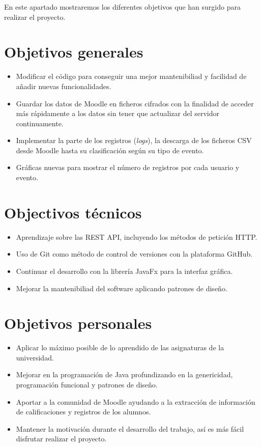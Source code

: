 
En este apartado mostraremos los diferentes objetivos que han surgido para realizar el proyecto.

\section{Objetivos generales}

\begin{itemize}
	\item Modificar el código para conseguir una mejor mantenibiliad y facilidad de añadir nuevas funcionalidades. 
	\item Guardar los datos de Moodle en ficheros cifrados con la finalidad de acceder más rápidamente a los datos sin tener que actualizar del servidor continuamente.
	\item Implementar la parte de los registros (\textit{logs}), la descarga de los ficheros CSV desde Moodle hasta su clasificación según su tipo de evento.
	\item Gráficas nuevas para mostrar el número de registros por cada usuario y evento.
\end{itemize}

\section{Objectivos técnicos}
\begin{itemize}
	\item Aprendizaje sobre las REST API, incluyendo los métodos de petición HTTP\cite{noauthor_http_nodate}.
	\item Uso de Git como método de control de versiones con la plataforma GitHub.
	\item Continuar el desarrollo con la librería JavaFx para la interfaz gráfica.
	\item Mejorar la mantenibiliad del software aplicando patrones de diseño.
\end{itemize}

\section{Objetivos personales}
\begin{itemize}
	\item Aplicar lo máximo posible de lo aprendido de las asignaturas de la universidad.
	\item Mejorar en la programación de Java profundizando en la genericidad, programación funcional y patrones de diseño.
	\item Aportar a la comunidad de Moodle ayudando a la extracción de información de calificaciones y registros de los alumnos.
	\item Mantener la motivación durante el desarrollo del trabajo, así es más fácil disfrutar realizar el proyecto.
\end{itemize}
